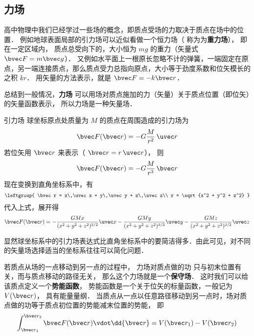 

\subsection{力场}
高中物理中我们已经学过一些场的概念，即质点受场的力取决于质点在场中的位置． 例如地球表面局部的引力场可以近似看做一个恒力场（ 称为为\textbf{重力场}）， 即在一定区域内， 质点总受向下的，大小恒为 $mg$ 的重力（矢量式 $\bvec F = m\bvec g$）． 又例如水平面上一根原长忽略不计的弹簧，一端固定在原点，另一端连接质点，那么质点受力总指向原点，大小等于劲度系数和位矢模长的之积 $kr$． 用矢量的方法表示，就是 $\bvec F = -k\bvec r$．

总结到一般情况，\textbf{力场} 可以用场对质点施加的力（矢量）关于质点位置（即位矢）的矢量函数表示， 所以力场是一种矢量场．


\begin{example}{引力场}\label{V_ex1}
球坐标原点处质量为 $M$ 的质点在周围造成的引力场为
\begin{equation}
\bvec F(\bvec r) =  - G\frac{M}{r^2}\,\uvec r
\end{equation} 
若位矢用 $\bvec r$ 来表示（ $\bvec r = r\,\uvec r$）， 则
\begin{equation}
\bvec F(\bvec r) =  - G\frac{M}{r^3}\,\bvec r
\end{equation}
现在变换到直角坐标系中，有
\begin{equation}
\leftgroup{
\bvec r = x\,\uvec x + y\,\uvec y + z\,\uvec z\\
r = \sqrt{x^2 + y^2 + z^2} 
}\end{equation} 
代入上式，展开得
\begin{equation}
\bvec F(\bvec r) =  - \frac{GMx}{(x^2+y^2+z^2)^{3/2}}\uvec x - \frac{GMy}{(x^2 +y^2+z^2)^{3/2}}\uvec y - \frac{GMz}{(x^2+y^2+z^2)^{3/2}}\uvec z 
\end{equation} 

显然球坐标系中的引力场表达式比直角坐标系中的要简洁得多．由此可见，对不同的矢量场选择适当的坐标系往往可以简化问题．
\end{example}

若质点从场的一点移动到另一点的过程中， 力场对质点做的功 只与初末位置有关，而与质点移动的路径无关， 那么这个力场就是一个\textbf{保守场}． 这时我们可以给该质点定义一个\textbf{势能函数}， 势能函数是一个关于位矢的标量函数，一般记为 $V(\bvec r)$， 具有能量量纲． 当质点从一点以任意路径移动到另一点时，场对质点做的功等于质点初位置的势能减末位置的势能， 即
\begin{equation}\label{V_eq1}
\int_{\bvec r_1}^{\bvec r_2} \bvec F(\bvec r) \vdot \dd{\bvec r} = V(\bvec r_1)-V(\bvec r_2)
\end{equation}

